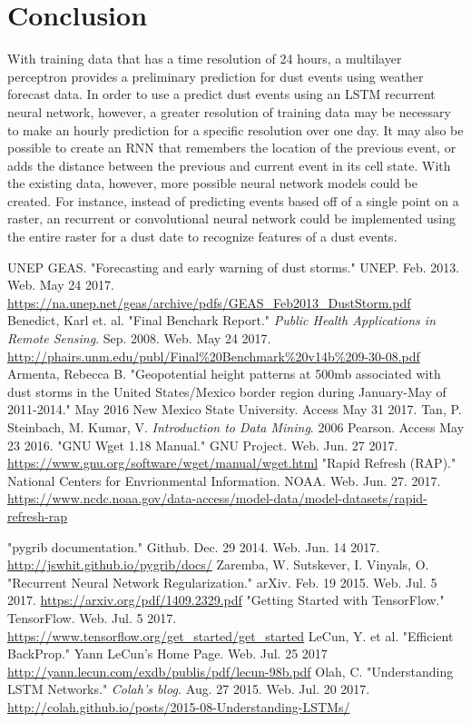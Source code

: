 \documentclass{article}
\begin{document}
\section{Conclusion}
With training data that has a time resolution of 24 hours, a multilayer perceptron provides a preliminary prediction for dust events using weather forecast data. In order to use a predict dust events using an LSTM recurrent neural network, however, a greater resolution of training data may be necessary to make an hourly prediction for a specific resolution over one day. It may also be possible to create an RNN that remembers the location of the previous event, or adds the distance between the previous and current event in its cell state. With the existing data, however, more possible neural network models could be created. For instance, instead of predicting events based off of a single point on a raster, an recurrent or convolutional neural network could be implemented using the entire raster for a dust date to recognize features of a dust events. 

\begin{thebibliography}{4}
			UNEP GEAS. "Forecasting and early warning of dust storms." UNEP. Feb. 2013. Web. May 24 2017. 
			\url{https://na.unep.net/geas/archive/pdfs/GEAS_Feb2013_DustStorm.pdf} 
			Benedict, Karl et. al. "Final Benchark Report." \textit{Public Health Applications in Remote Sensing}. Sep. 2008. Web. May 24 2017. \url{http://phairs.unm.edu/publ/Final%20Benchmark%20v14b%209-30-08.pdf}
		 Armenta, Rebecca B. "Geopotential height patterns at 500mb associated with dust storms in the United States/Mexico border region during January-May of 2011-2014." May 2016 New Mexico State University.  Access May 31 2017.
			Tan, P. Steinbach, M. Kumar, V. \textit{Introduction to Data Mining}. 2006 Pearson. Access May 23 2016. 
		 "GNU Wget 1.18 Manual." GNU Project. Web. Jun. 27 2017. \url{https://www.gnu.org/software/wget/manual/wget.html}
		"Rapid Refresh (RAP)." National Centers for Envrionmental Information. NOAA. Web. Jun. 27. 2017. \url{https://www.ncdc.noaa.gov/data-access/model-data/model-datasets/rapid-refresh-rap}

		 "pygrib documentation." Github. Dec. 29 2014. Web. Jun. 14 2017. \url{http://jswhit.github.io/pygrib/docs/}
		 Zaremba, W. Sutskever, I. Vinyals, O. "Recurrent Neural Network Regularization." arXiv. Feb. 19 2015. Web. Jul. 5 2017. \url{https://arxiv.org/pdf/1409.2329.pdf}
		 "Getting Started with TensorFlow." TensorFlow. Web. Jul. 5 2017. \url{https://www.tensorflow.org/get_started/get_started}
		 LeCun, Y. et al. "Efficient BackProp." Yann LeCun's Home Page. Web. Jul. 25 2017 \url{http://yann.lecun.com/exdb/publis/pdf/lecun-98b.pdf}
		 Olah, C. "Understanding LSTM Networks." \textit{Colah's blog.} Aug. 27 2015. Web. Jul. 20 2017. \url{http://colah.github.io/posts/2015-08-Understanding-LSTMs/}


\end{thebibliography}
\end{document}
